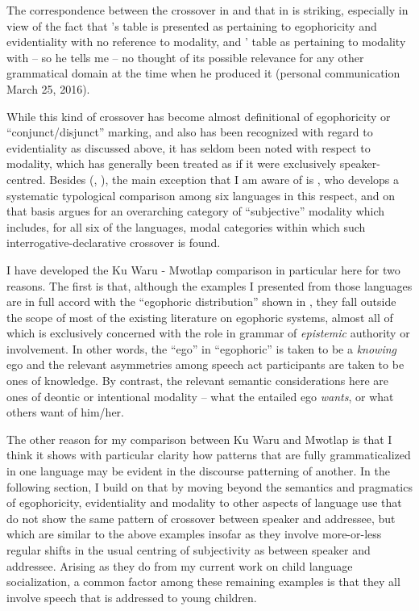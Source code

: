 \documentclass[output=paper]{langsci/langscibook}
\begin{document}
The correspondence between the crossover in  and that in  is striking, especially in view of the fact that \citeauthor{SanRoqueSchieffelin2018}’s table is presented as pertaining to egophoricity and evidentiality with no reference to modality, and \citeauthor{Francois2003}’ table as pertaining to modality with – so he tells me – no thought of its possible relevance for any other grammatical domain at the time when he produced it (personal communication March 25, 2016).

While this kind of crossover has become almost definitional of egophoricity or “conjunct/disjunct” marking, and also has been recognized with regard to evidentiality as discussed above, it has seldom been noted with respect to modality, which has generally been treated as if it were exclusively speaker-centred. Besides \citeauthor{Francois2003} (\citeyear{Francois2003}, \citeyear{Francois2004}), the main exception that I am aware of is \cite{Lehmann2012}, who develops a systematic typological comparison among six languages in this respect, and on that basis argues for an overarching category of “subjective” modality which includes, for all six of the languages, modal categories within which such interrogative-declarative crossover is found.

I have developed the Ku Waru - Mwotlap comparison in particular here for two reasons.  The first is that, although the examples I presented from those languages are in full accord with the “egophoric distribution” shown in , they fall outside the scope of most of the existing literature on egophoric systems, almost all of which is exclusively concerned with the role in grammar of \textit{epistemic} authority or involvement. In other words, the “ego” in “egophoric” is taken to be a \textit{knowing} ego and the relevant asymmetries among speech act participants are taken to be ones of knowledge. By contrast, the relevant semantic considerations here are ones of deontic or intentional modality – what the entailed ego \textit{wants}, or what others want of him/her.

The other reason for my comparison between Ku Waru and Mwotlap is that I think it shows with particular clarity how patterns that are fully grammaticalized in one language may be evident in the discourse patterning of another. In the following section, I build on that by moving beyond the semantics and pragmatics of egophoricity, evidentiality and modality to other aspects of language use that do not show the same pattern of crossover between speaker and addressee, but which are similar to the above examples insofar as they involve more-or-less regular shifts in the usual centring of subjectivity as between speaker and addressee.  Arising as they do from my current work on child language socialization, a common factor among these remaining examples is that they all involve speech that is addressed to young children.
\end{document}

